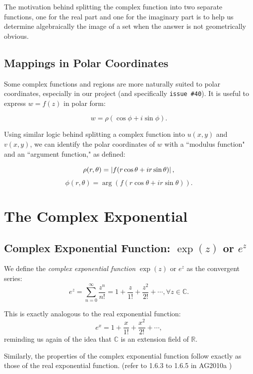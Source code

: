 \documentclass[11pt,reqno,oneside,a4paper]{article}
\begin{document}
The motivation behind splitting the complex function into two separate functions, one for the real part and one for the imaginary part is to help us determine algebraically the image of a set when the answer is not geometrically obvious. 

\subsection{Mappings in Polar Coordinates}

Some complex functions and regions are more naturally suited to polar coordinates, especially in our project (and specifically \verb|issue #40|). It is useful to express $w=f(z)$ in polar form: 

$$w=\rho(\cos\phi + i \sin\phi).$$

Using similar logic behind splitting a complex function into $u(x,y)$ and $v(x,y)$, we can identify the polar coordinates of $w$ with a ``modulus function" and an ``argument function," as defined:

$$\rho(r,\theta ) = \left\lvert f(r\cos\theta + ir\sin\theta)\right\rvert,$$
$$\phi(r,\theta) = \arg (f(r\cos\theta + ir\sin \theta)).$$

\section{The Complex Exponential}

\subsection{Complex Exponential Function: $\exp(z)$ or $e^z$}

\begin{defn}
	We define the \textit{complex exponential function} $\exp(z)$ or $e^z$ as the convergent series:
	$$e^z = \sum_{n=0}^{\infty}\frac{z^n}{n!} = 1 + \frac{z}{1!} + \frac{z^2}{2!} +\cdots, \forall z\in \mathbb{C}.$$
\end{defn}

\begin{rmk}
	This is exactly analogous to the real exponential function:
	$$e^x = 1 + \frac{x}{1!} + \frac{x^2}{2!}+\cdots,$$
	reminding us again of the idea that $\mathbb{C}$ is an extension field of $\mathbb{R}$.
\end{rmk}

Similarly, the properties of the complex exponential function follow exactly as those of the real exponential function. (refer to 1.6.3 to 1.6.5 in AG2010a \cite{AG2010a})
\end{document}
